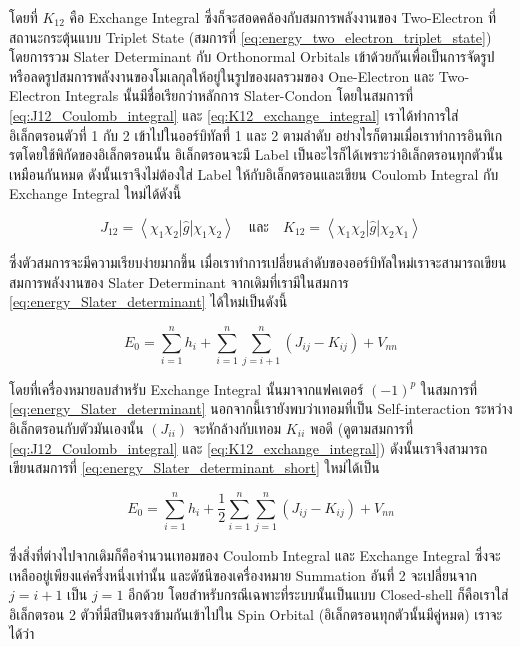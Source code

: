 \noindent โดยที่ $K_{12}$ คือ Exchange Integral ซึ่งก็จะสอดคล้องกับสมการพลังงานของ Two-Electron ที่สถานะกระตุ้นแบบ Triplet
State (สมการที่ \eqref{eq:energy_two_electron_triplet_state}) โดยการรวม Slater Determinant กับ Orthonormal Orbitals
เข้าด้วยกันเพื่อเป็นการจัดรูปหรือลดรูปสมการพลังงานของโมเลกุลให้อยู่ในรูปของผลรวมของ One-Electron และ Two-Electron Integrals
นั้นมีชื่อเรียกว่าหลักการ Slater-Condon โดยในสมการที่ \eqref{eq:J12_Coulomb_integral} และ \eqref{eq:K12_exchange_integral}
เราได้ทำการใส่อิเล็กตรอนตัวที่ 1 กับ 2 เข้าไปในออร์บิทัลที่ 1 และ 2 ตามลำดับ อย่างไรก็ตามเมื่อเราทำการอินทิเกรตโดยใช้พิกัดของอิเล็กตรอนนั้น%
อิเล็กตรอนจะมี Label เป็นอะไรก็ได้เพราะว่าอิเล็กตรอนทุกตัวนั้นเหมือนกันหมด ดังนั้นเราจึงไม่ต้องใส่ Label ให้กับอิเล็กตรอนและเขียน Coulomb
Integral กับ Exchange Integral ใหม่ได้ดังนี้

\begin{equation}
  J_{12} = \left\langle\chi_1 \chi_2|\hat{g}| \chi_1 \chi_2\right\rangle
  \quad \text{และ} \quad
  K_{12} = \left\langle\chi_1 \chi_2|\hat{g}| \chi_2 \chi_1\right\rangle
\end{equation}

\noindent ซึ่งตัวสมการจะมีความเรียบง่ายมากขึ้น เมื่อเราทำการเปลี่ยนลำดับของออร์บิทัลใหม่เราจะสามารถเขียนสมการพลังงานของ Slater
Determinant จากเดิมที่เรามีในสมการ \eqref{eq:energy_Slater_determinant} ได้ใหม่เป็นดังนี้

\begin{equation}
  \label{eq:energy_Slater_determinant_short}
  E_0
  =
  \sum_{i=1}^n h_i
  + \sum_{i=1}^n \sum_{j=i+1}^n
  \left(J_{i j}-K_{i j}\right)
  + V_{n n}
\end{equation}

\noindent โดยที่เครื่องหมายลบสำหรับ Exchange Integral นั้นมาจากแฟคเตอร์ $(-1)^p$ ในสมการที่ \eqref{eq:energy_Slater_determinant}
นอกจากนี้เรายังพบว่าเทอมที่เป็น Self-interaction ระหว่างอิเล็กตรอนกับตัวมันเองนั้น $(J_{i i})$ จะหักล้างกับเทอม $K_{i i}$ พอดี
(ดูตามสมการที่ \eqref{eq:J12_Coulomb_integral} และ \eqref{eq:K12_exchange_integral}) ดังนั้นเราจึงสามารถเขียนสมการที่
\eqref{eq:energy_Slater_determinant_short} ใหม่ได้เป็น

\begin{equation}
  \label{eq:energy_Slater_determinant_reduced}
  E_0 = \sum_{i=1}^n h_i
  + \frac{1}{2} \sum_{i=1}^n \sum_{j=1}^n\left(J_{i j}-K_{i j}\right)
  + V_{n n}
\end{equation}

\noindent ซึ่งสิ่งที่ต่างไปจากเดิมก็คือจำนวนเทอมของ Coulomb Integral และ Exchange Integral ซึ่งจะเหลืออยู่เพียงแค่ครึ่งหนึ่งเท่านั้น%
และดัชนีของเครื่องหมาย Summation อันที่ 2 จะเปลี่ยนจาก $j = i+1$ เป็น $j = 1$ อีกด้วย โดยสำหรับกรณีเฉพาะที่ระบบนั้นเป็นแบบ
Closed-shell ก็คือเราใส่อิเล็กตรอน 2 ตัวที่มีสปินตรงข้ามกันเข้าไปใน Spin Orbital (อิเล็กตรอนทุกตัวนั้นมีคู่หมด) เราจะได้ว่า

